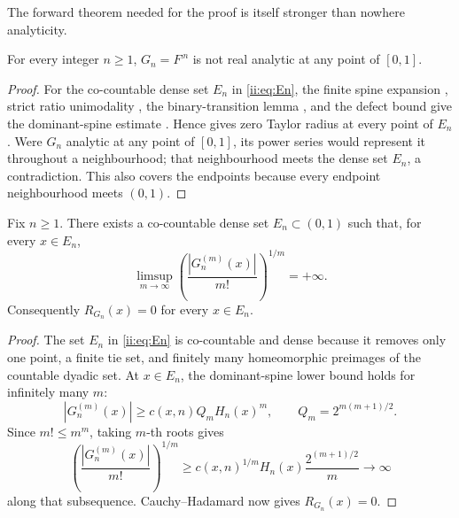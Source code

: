 The forward theorem needed for the proof is itself stronger than nowhere analyticity.

\begin{theorem}
\label{ii:thm:main}
For every integer $n\geq1$, $G_n=F^{\comp n}$ is not real analytic at any point of
$[0,1]$.
\end{theorem}

\begin{proof}
For the co-countable dense set $E_n$ in \eqref{ii:eq:En}, the finite spine
expansion , strict ratio unimodality
, the binary-transition lemma
, and the defect bound
 give the dominant-spine estimate
.  Hence  gives zero
Taylor radius at every point of $E_n$.  Were $G_n$ analytic at any point of
$[0,1]$, its power series would represent it throughout a neighbourhood;
that neighbourhood meets the dense set $E_n$, a contradiction.  This also
covers the endpoints because every endpoint neighbourhood meets $(0,1)$.
\end{proof}

\begin{theorem}
\label{ii:thm:strong}
Fix $n\geq1$.  There exists a co-countable dense set $E_n\subset(0,1)$ such that, for
every $x\in E_n$,
\begin{equation}
 \limsup_{m\to\infty}
 \left(\frac{|G_n^{(m)}(x)|}{m!}\right)^{1/m}=+\infty.
 \label{ii:eq:infinite-limsup}
\end{equation}
Consequently $R_{G_n}(x)=0$ for every $x\in E_n$.
\end{theorem}

\begin{proof}
The set $E_n$ in \eqref{ii:eq:En} is co-countable and dense because it removes
only one point, a finite tie set, and finitely many homeomorphic preimages of
the countable dyadic set.  At $x\in E_n$, the dominant-spine lower bound
 holds for infinitely many $m$:
\[
 |G_n^{(m)}(x)|\ge c(x,n)Q_mH_n(x)^m,
 \qquad Q_m=2^{m(m+1)/2}.
\]
Since $m!\le m^m$, taking $m$-th roots gives
\begin{equation}
 \left(\frac{|G_n^{(m)}(x)|}{m!}\right)^{1/m}
 \ge c(x,n)^{1/m}H_n(x)\frac{2^{(m+1)/2}}m\longrightarrow\infty
 \label{ii:eq:root-divergence}
\end{equation}
along that subsequence.  Cauchy--Hadamard now gives $R_{G_n}(x)=0$.
\end{proof}


